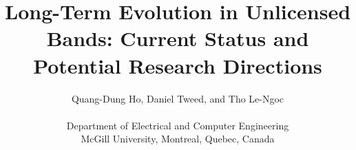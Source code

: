 \documentclass[12pt,onecolumn]{article}
\begin{document}
\title{\textbf{Long-Term Evolution in Unlicensed Bands: Current Status and Potential Research Directions}}


\author{Quang-Dung Ho, Daniel Tweed, and Tho Le-Ngoc\\
\\\vspace{6pt} Department of Electrical and Computer Engineering\\
McGill University, Montreal, Quebec, Canada}


\maketitle
\end{document}
